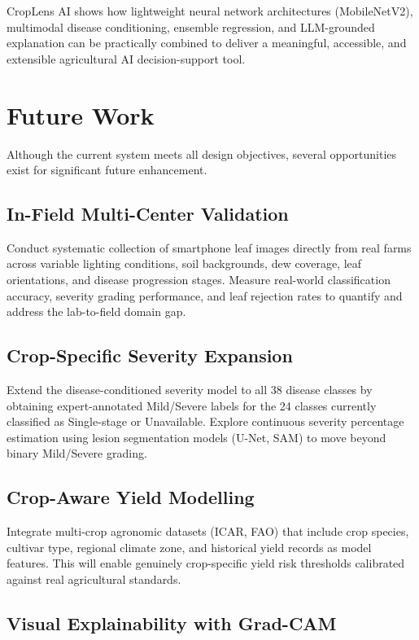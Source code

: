 CropLens AI shows how lightweight neural network architectures (MobileNetV2), multimodal disease conditioning, ensemble regression, and LLM-grounded explanation can be practically combined to deliver a meaningful, accessible, and extensible agricultural AI decision-support tool.

\section{Future Work}

Although the current system meets all design objectives, several opportunities exist for significant future enhancement.

\subsection{In-Field Multi-Center Validation}

Conduct systematic collection of smartphone leaf images directly from real farms across variable lighting conditions, soil backgrounds, dew coverage, leaf orientations, and disease progression stages. Measure real-world classification accuracy, severity grading performance, and leaf rejection rates to quantify and address the lab-to-field domain gap.

\subsection{Crop-Specific Severity Expansion}

Extend the disease-conditioned severity model to all 38 disease classes by obtaining expert-annotated Mild/Severe labels for the 24 classes currently classified as Single-stage or Unavailable. Explore continuous severity percentage estimation using lesion segmentation models (U-Net, SAM) to move beyond binary Mild/Severe grading.

\subsection{Crop-Aware Yield Modelling}

Integrate multi-crop agronomic datasets (ICAR, FAO) that include crop species, cultivar type, regional climate zone, and historical yield records as model features. This will enable genuinely crop-specific yield risk thresholds calibrated against real agricultural standards.

\subsection{Visual Explainability with Grad-CAM}


